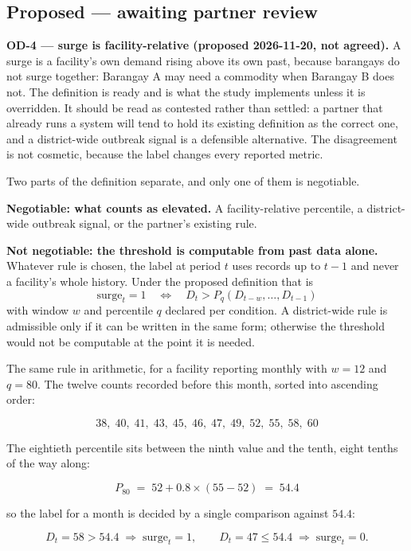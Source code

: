 \subsection{Proposed --- awaiting partner review}

\textbf{OD-4 --- surge is facility-relative (proposed 2026-11-20, not agreed).}
A surge is a facility's own demand rising above its own past, because barangays do not surge
together: Barangay A may need a commodity when Barangay B does not. The definition is ready and is
what the study implements unless it is overridden. It should be read as contested rather than
settled: a partner that already runs a system will tend to hold its existing definition as the
correct one, and a district-wide outbreak signal is a defensible alternative. The disagreement is
not cosmetic, because the label changes every reported metric.

Two parts of the definition separate, and only one of them is negotiable.

\textbf{Negotiable: what counts as elevated.} A facility-relative percentile, a district-wide
outbreak signal, or the partner's existing rule.

\textbf{Not negotiable: the threshold is computable from past data alone.} Whatever rule is chosen,
the label at period $t$ uses records up to $t-1$ and never a facility's whole history. Under the
proposed definition that is
\[
\text{surge}_t = 1 \quad\Longleftrightarrow\quad D_t > P_q\!\left(D_{t-w},\ldots,D_{t-1}\right)
\]
with window $w$ and percentile $q$ declared per condition. A district-wide rule is admissible only
if it can be written in the same form; otherwise the threshold would not be computable at the point
it is needed.

\noindent
The same rule in arithmetic, for a facility reporting monthly with $w = 12$ and $q = 80$. The
twelve counts recorded before this month, sorted into ascending order:

\[
38,\;40,\;41,\;43,\;45,\;46,\;47,\;49,\;52,\;55,\;58,\;60
\]

\noindent
The eightieth percentile sits between the ninth value and the tenth, eight tenths of the way along:

\[
P_{80} \;=\; 52 + 0.8 \times (55 - 52) \;=\; 54.4
\]

\noindent
so the label for a month is decided by a single comparison against $54.4$:

\[
D_t = 58 > 54.4 \;\Longrightarrow\; \text{surge}_t = 1,
\qquad
D_t = 47 \le 54.4 \;\Longrightarrow\; \text{surge}_t = 0 .
\]

